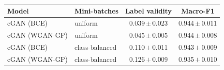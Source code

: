 \begin{tabular}{llcc}
\toprule
\textbf{Model} & \textbf{Mini-batches} & \textbf{Label validity} & \textbf{Macro-F1}\\
\midrule
cGAN (BCE) & uniform & 0.039\,$\pm$\,0.023 & 0.944\,$\pm$\,0.011\\
cGAN (WGAN-GP) & uniform & 0.045\,$\pm$\,0.005 & 0.944\,$\pm$\,0.008\\
cGAN (BCE) & class-balanced & 0.110\,$\pm$\,0.011 & 0.943\,$\pm$\,0.009\\
cGAN (WGAN-GP) & class-balanced & 0.126\,$\pm$\,0.009 & 0.935\,$\pm$\,0.010\\\bottomrule
\end{tabular}
